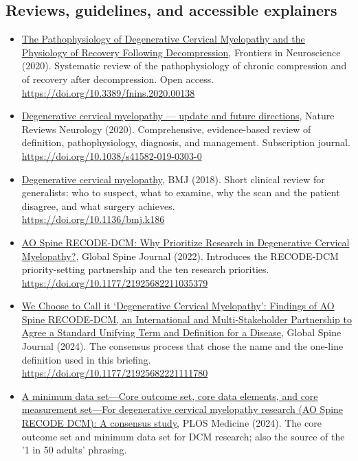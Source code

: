 \documentclass[11pt, letterpaper]{article}
\begin{document}
\subsection*{Reviews, guidelines, and accessible explainers}
\begin{itemize}
  \item \href{https://doi.org/10.3389/fnins.2020.00138}{The Pathophysiology of Degenerative Cervical Myelopathy and the Physiology of Recovery Following Decompression}, Frontiers in Neuroscience (2020). Systematic review of the pathophysiology of chronic compression and of recovery after decompression. Open access.
        \\ {\small\url{https://doi.org/10.3389/fnins.2020.00138}}
  \item \href{https://doi.org/10.1038/s41582-019-0303-0}{Degenerative cervical myelopathy — update and future directions}, Nature Reviews Neurology (2020). Comprehensive, evidence-based review of definition, pathophysiology, diagnosis, and management. Subscription journal.
        \\ {\small\url{https://doi.org/10.1038/s41582-019-0303-0}}
  \item \href{https://doi.org/10.1136/bmj.k186}{Degenerative cervical myelopathy}, BMJ (2018). Short clinical review for generalists: who to suspect, what to examine, why the scan and the patient disagree, and what surgery achieves.
        \\ {\small\url{https://doi.org/10.1136/bmj.k186}}
  \item \href{https://doi.org/10.1177/21925682211035379}{AO Spine RECODE-DCM: Why Prioritize Research in Degenerative Cervical Myelopathy?}, Global Spine Journal (2022). Introduces the RECODE-DCM priority-setting partnership and the ten research priorities.
        \\ {\small\url{https://doi.org/10.1177/21925682211035379}}
  \item \href{https://doi.org/10.1177/21925682221111780}{We Choose to Call it ‘Degenerative Cervical Myelopathy’: Findings of AO Spine RECODE-DCM, an International and Multi-Stakeholder Partnership to Agree a Standard Unifying Term and Definition for a Disease}, Global Spine Journal (2024). The consensus process that chose the name and the one-line definition used in this briefing.
        \\ {\small\url{https://doi.org/10.1177/21925682221111780}}
  \item \href{https://doi.org/10.1371/journal.pmed.1004447}{A minimum data set—Core outcome set, core data elements, and core measurement set—For degenerative cervical myelopathy research (AO Spine RECODE DCM): A consensus study}, PLOS Medicine (2024). The core outcome set and minimum data set for DCM research; also the source of the '1 in 50 adults' phrasing.

\end{itemize}
\end{document}
